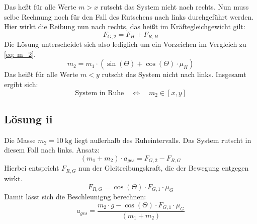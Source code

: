 Das heßt für alle Werte $m > x$ rutscht das System nicht nach rechts. Nun muss selbe Rechnung noch für den Fall des Rutschens nach
links durchgeführt werden. Hier wirkt die Reibung nun nach rechts, das heißt im Kräftegleichgewicht gilt:
\begin{equation}
  F_{G,2}  = F_H + F_{R,H}
\end{equation}
Die Lösung unterscheidet sich also lediglich um ein Vorzeichen im Vergleich zu \eqref{eq: m_2}.
\begin{equation}
  m_2 = m_1 \cdot (\sin\left(\Theta\right) + \cos\left(\Theta\right)  \cdot \mu_H)
\end{equation}
Das heißt für alle Werte $m < y$ rutscht das System nicht nach links. Insgesamt ergibt sich:
\begin{equation}
  \text{System in Ruhe} \quad \Leftrightarrow \quad m_2 \in [x,y]
\end{equation}
\subsection{Lösung ii}
Die Masse $m_2 = \SI{10}{\kilo\gram}$ liegt außerhalb des Ruheintervalls. Das System rutscht in diesem Fall nach links. Ansatz:
\begin{equation}
  (m_1 + m_2) \cdot a_{ges} = F_{G,2} - F_{R, G}
\end{equation}
Hierbei entspricht $F_{R, G}$ nun der Gleitreibungskraft, die der Bewegung entgegen wirkt.
\begin{equation}
  F_{R, G} = \cos\left(\Theta\right) \cdot F_{G,1} \cdot \mu_G
\end{equation}
Damit lässt sich die Beschleunigng berechnen:
\begin{equation}
    a_{ges} = \frac{m_2 \cdot g - \cos\left(\Theta\right) \cdot F_{G,1} \cdot \mu_G}{(m_1 + m_2)}
\end{equation}


\newpage
